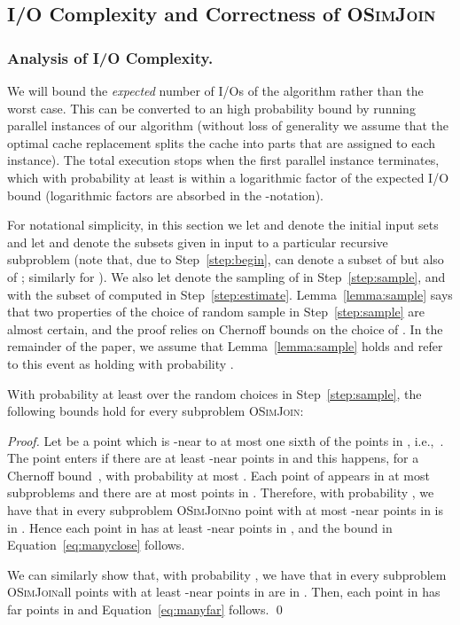 \documentclass{llncs}
\newcommand{\SimJoin}{\textsc{OSimJoin}}
\begin{document}
\subsection{I/O Complexity and Correctness of \SimJoin\ }\label{sec:analysisIO}

\subsubsection{Analysis of I/O Complexity.}

We will bound the \emph{expected} number of I/Os of the algorithm rather than the worst case. 
This can be converted to an high probability bound by running  parallel instances of our algorithm 
(without loss of generality we assume that the optimal cache replacement 
splits the cache into  parts that are assigned
to each instance).
The total execution stops when the first parallel instance terminates, which with probability at least 
 is within a logarithmic factor of the expected I/O bound (logarithmic factors 
are absorbed in the -notation).

For notational simplicity, in this section we let  and  denote the initial input sets and let  and  denote the subsets given in input to a particular recursive subproblem (note that, due to Step~\ref{step:begin},   can denote a subset of  but also of ; similarly for ). 
We also let  denote the sampling of  in Step~\ref{step:sample}, and with  the subset of  computed in Step~\ref{step:estimate}. 
Lemma~\ref{lemma:sample} says that two properties of the choice of random sample in Step~\ref{step:sample} are almost certain, and the proof relies on Chernoff bounds on the choice of . 
In the remainder of the paper, we assume that Lemma~\ref{lemma:sample} holds and refer to this event as  holding with probability .


\begin{lemma}\label{lemma:sample}
With probability at least  over the random choices in Step~\ref{step:sample},
the following bounds hold for every  subproblem \SimJoin:


\end{lemma}

\begin{proof}



Let  be a point which is -near to at most one sixth of the points in , 
i.e.,~.
The point  enters  if there are at least  -near points in 
 and this happens, for a 
Chernoff bound~\cite[Theorem 1.1]{PanconesiDubhashiBook},  with probability at most .
Each point of   appears in at most  subproblems 
and there are at most  points in .
Therefore, with probability , we have that 
in every subproblem \SimJoin no point with at most  -near 
points in  is in . Hence each point in  has at least   -near 
points in , and the bound in Equation~\ref{eq:manyclose} follows.


We can similarly show that,  with probability , we have that 
in every subproblem \SimJoin all points with at least   -near 
points in  are in . Then, each point in  has 
far points in  and Equation~\ref{eq:manyfar} follows.
\qed

\end{proof}
\end{document}
